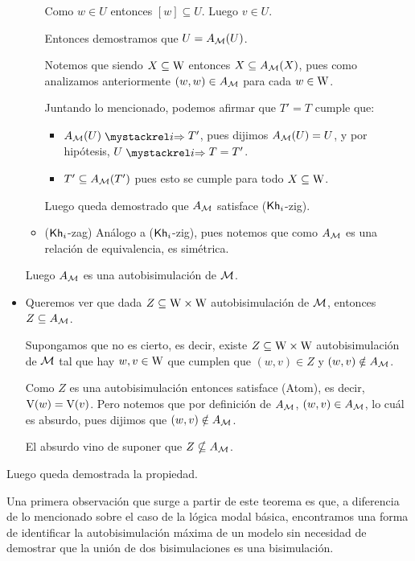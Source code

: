 \begin{demostracion}
\begin{itemize}
\begin{itemize}
            Como $w \in U$ entonces $[w] \subseteq U$. Luego $v \in U$.

            Entonces demostramos que $U = A_{\mathcal{M}}(U)$.

            Notemos que siendo $X \subseteq \mathrm{W}$ entonces $X \subseteq A_{\mathcal{M}}(X)$, pues como analizamos anteriormente 
            $(w,w) \in A_{\mathcal{M}}$ para cada $w \in \mathrm{W}$.

            Juntando lo mencionado, podemos afirmar que $T' = T$ cumple que:

             \begin{itemize}
                \item $A_\modults(U) \ultsExecAgi T'$, pues dijimos $A_{\mathcal{M}}(U) = U$, y por hipótesis, $U \ultsExecAgi T = T'$.  
                \item $T' \subseteq A_{\mathcal{M}}(T')$ pues esto se cumple para todo $X \subseteq \mathrm{W}$.
            \end{itemize}
            Luego queda demostrado que $A_{\mathcal{M}}$ satisface ($\mathsf{Kh}_i$-zig).

            \item ($\mathsf{Kh}_i$-zag) Análogo a ($\mathsf{Kh}_i$-zig), pues notemos que como $A_{\mathcal{M}}$ es una relación de equivalencia, es simétrica.
        \end{itemize}

        Luego $A_{\mathcal{M}}$ es una autobisimulación de $\mathcal{M}$.
        
        \item Queremos ver que dada $Z \subseteq \mathrm{W} \times \mathrm{W}$ autobisimulación de $\mathcal{M}$, entonces $Z \subseteq A_{\mathcal{M}}$.
        
        Supongamos que no es cierto, es decir, existe $Z \subseteq \mathrm{W} \times \mathrm{W}$ autobisimulación de $\mathcal{M}$ tal que hay 
        $w,v \in \mathrm{W}$ que cumplen que $(w,v) \in Z$ y $(w,v) \notin A_{\mathcal{M}}$. 

        Como $Z$ es una autobisimulación entonces satisface (Atom), es decir, $\mathrm{V}(w) = \mathrm{V}(v)$. Pero notemos que por definición de 
        $A_{\mathcal{M}}$, $(w,v) \in A_{\mathcal{M}}$, lo cuál es absurdo, pues dijimos que $(w,v) \notin A_{\mathcal{M}}$.

        El absurdo vino de suponer que $Z \nsubseteq A_{\mathcal{M}}$.    
    \end{itemize}
    Luego queda demostrada la propiedad.
\end{demostracion}

Una primera observación que surge a partir de este teorema es que, a diferencia de lo mencionado sobre el caso de la lógica modal básica, 
encontramos una forma de identificar la autobisimulación máxima de un modelo sin necesidad de demostrar que la unión de dos bisimulaciones es una bisimulación. 

